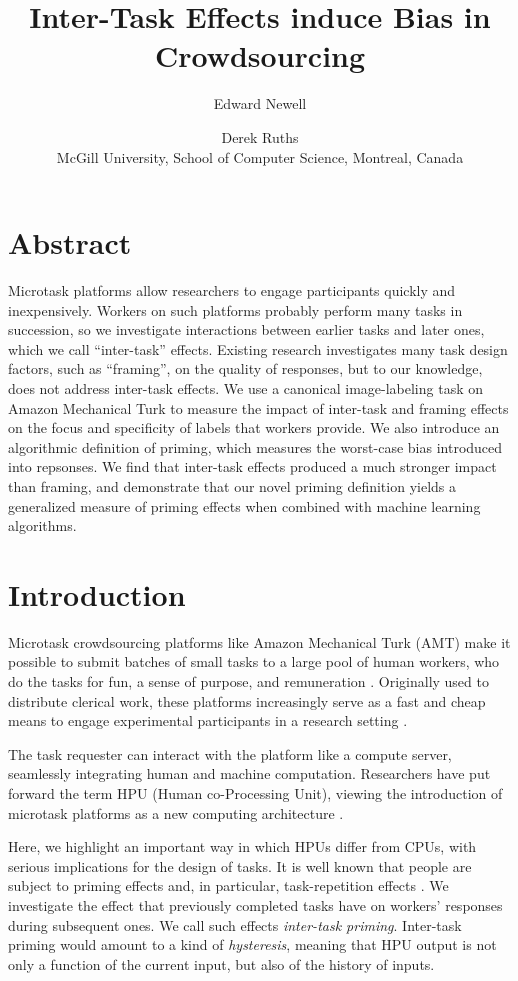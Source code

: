 \documentclass[letterpaper]{article}
\title{Inter-Task Effects induce Bias in Crowdsourcing}
\author{Edward Newell \and Derek Ruths\\
	McGill University, School of Computer Science, Montreal, Canada\\
}
\begin{document}
\maketitle
\section*{Abstract}
Microtask platforms allow researchers to engage participants quickly and 
inexpensively.
Workers on such platforms probably perform many tasks in succession,
so we investigate interactions between earlier tasks and later ones, which we 
call ``inter-task'' effects.  
Existing research investigates many task design factors, such as 
``framing'', on the quality of responses, but to our knowledge, does not 
address inter-task effects.  
We use a canonical image-labeling task on Amazon Mechanical Turk 
to measure the impact of inter-task and framing effects on the focus and 
specificity of labels that workers provide.
We also introduce an algorithmic definition of priming, which measures the 
worst-case bias introduced into repsonses.
We find that inter-task effects produced a much stronger impact than framing, 
and demonstrate that our novel priming definition yields a generalized 
measure of priming effects when combined with machine learning algorithms.


\section*{Introduction}

Microtask crowdsourcing platforms like Amazon Mechanical Turk (AMT) make it 
possible to submit batches of small tasks to a large pool of human workers, 
who do the tasks for fun, a sense of purpose, and remuneration 
\cite{kazai2013analysis,Antin20122925}.  
Originally used to distribute clerical work, these platforms 
increasingly serve as a fast and cheap means to engage experimental 
participants in a research 
setting \cite{snow2008cheap}.  

The task requester can interact with the platform like a compute server, 
seamlessly 
integrating human and machine computation.  Researchers have put forward the 
term HPU (Human co-Processing Unit), viewing the introduction of 
microtask platforms as a new computing architecture
\cite{5543192}.  

Here, we highlight an important way in which HPUs differ from CPUs, with 
serious implications for the design of tasks.  It is well known that people 
are subject to priming effects 
\cite{BJOP1796,No2007,beller1971priming} and, in particular, task-repetition effects
\cite{Gass1999549,sohn2001task}.  
We investigate the effect that previously completed tasks have on workers'
responses during subsequent ones. We call such effects 
\textit{inter-task priming}.  Inter-task priming would amount to a kind of
\textit{hysteresis}, meaning that HPU output is not only a function of the 
current input, but also of the history of inputs.
\end{document}
